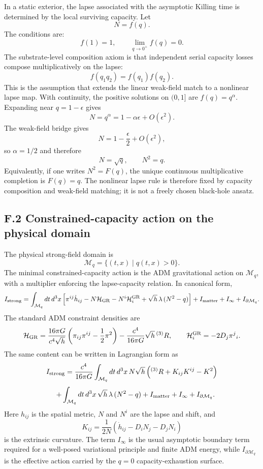 \documentclass[11pt]{article}
\begin{document}
In a static exterior, the lapse associated with the asymptotic Killing time is determined by the local surviving capacity. Let
\[
N=f(q).
\]
The conditions are:
\[
f(1)=1,\qquad \lim_{q\to0^+}f(q)=0.
\]
The substrate-level composition axiom is that independent serial capacity losses compose multiplicatively on the lapse:
\[
f(q_1q_2)=f(q_1)f(q_2).
\]
This is the assumption that extends the linear weak-field match to a nonlinear lapse map. With continuity, the positive solutions on $(0,1]$ are $f(q)=q^\alpha$. Expanding near $q=1-\epsilon$ gives
\[
N=q^\alpha=1-\alpha\epsilon+O(\epsilon^2).
\]
The weak-field bridge gives
\[
N=1-\frac{\epsilon}{2}+O(\epsilon^2),
\]
so $\alpha=1/2$ and therefore
\[
N=\sqrt q,
\qquad
N^2=q.
\]
Equivalently, if one writes $N^2=F(q)$, the unique continuous multiplicative completion is $F(q)=q$. The nonlinear lapse rule is therefore fixed by capacity composition and weak-field matching; it is not a freely chosen black-hole ansatz.

\subsection*{F.2 Constrained-capacity action on the physical domain}

The physical strong-field domain is
\[
\mathcal{M}_q=\{(t,x)\mid q(t,x)>0\}.
\]
The minimal constrained-capacity action is the ADM gravitational action on $\mathcal{M}_q$, with a multiplier enforcing the lapse-capacity relation. In canonical form,
\[
I_{\rm strong}
=
\int_{\mathcal{M}_q}dt\,d^3x
\left[
\pi^{ij}\dot h_{ij}
-N\mathcal H_{\rm GR}
-N^i\mathcal H^{\rm GR}_i
+\sqrt h\,\lambda\,(N^2-q)
\right]
+
I_{\rm matter}
+
I_\infty
+
I_{\partial\mathcal{M}_q}.
\]
The standard ADM constraint densities are
\[
\mathcal H_{\rm GR}
=
\frac{16\pi G}{c^4\sqrt h}
\left(\pi_{ij}\pi^{ij}-\frac12\pi^2\right)
-
\frac{c^4}{16\pi G}\sqrt h\,{}^{(3)}R,
\qquad
\mathcal H^{\rm GR}_i=-2D_j\pi^j{}_i.
\]
The same content can be written in Lagrangian form as
\[
I_{\rm strong}
=
\frac{c^4}{16\pi G}
\int_{\mathcal{M}_q}dt\,d^3x\,
N\sqrt h\left({}^{(3)}R+K_{ij}K^{ij}-K^2\right)
\]
\[
\quad
+
\int_{\mathcal{M}_q}dt\,d^3x\,\sqrt h\,\lambda\,(N^2-q)
+
I_{\rm matter}
+
I_\infty
+
I_{\partial\mathcal{M}_q}.
\]
Here $h_{ij}$ is the spatial metric, $N$ and $N^i$ are the lapse and shift, and
\[
K_{ij}=\frac{1}{2N}
\left(\dot h_{ij}-D_iN_j-D_jN_i\right)
\]
is the extrinsic curvature. The term $I_\infty$ is the usual asymptotic boundary term required for a well-posed variational principle and finite ADM energy, while $I_{\partial\mathcal{M}_q}$ is the effective action carried by the $q=0$ capacity-exhaustion surface.
\end{document}
